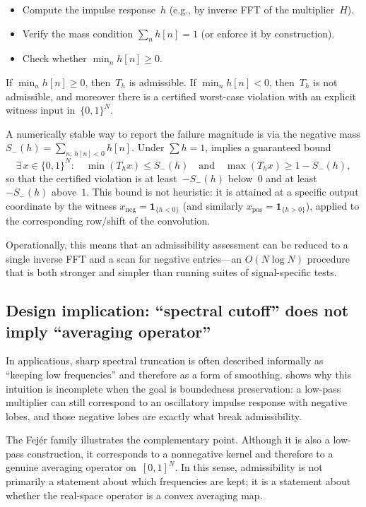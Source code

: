 \documentclass[11pt,a4paper]{article}
\theoremstyle{plain}
\theoremstyle{definition}
\theoremstyle{plain}
\newcommand{\xneg}{x_{\mathrm{neg}}}
\newcommand{\xpos}{x_{\mathrm{pos}}}
\newcommand{\Sminus}{S_{-}}
\begin{document}
\begin{itemize}[leftmargin=2em]
  \item Compute the impulse response~$h$ (e.g., by inverse FFT of the
    multiplier~$H$).
  \item Verify the mass condition $\sum_n h[n] = 1$ (or enforce it by
    construction).
  \item Check whether $\min_n h[n] \ge 0$.
\end{itemize}

If $\min_n h[n] \ge 0$, then~$T_h$ is admissible.  If $\min_n h[n] < 0$,
then~$T_h$ is not admissible, and moreover there is a certified worst-case
violation with an explicit witness input in~$\{0,1\}^N$.

A numerically stable way to report the failure magnitude is via the negative mass
$\Sminus(h) = \sum_{n:\,h[n]<0} h[n]$.  Under $\sum h = 1$, 
implies a guaranteed bound
\[
  \exists\,x \in \{0,1\}^N:\quad
  \min(T_h x) \le \Sminus(h)
  \quad\text{and}\quad
  \max(T_h x) \ge 1 - \Sminus(h),
\]
so that the certified violation is at least~$-\Sminus(h)$ below~$0$ and at
least~$-\Sminus(h)$ above~$1$.  This bound is not heuristic: it is attained at a
specific output coordinate by the witness
$\xneg = \mathbf{1}_{\{h<0\}}$ (and similarly
$\xpos = \mathbf{1}_{\{h>0\}}$), applied to the corresponding row/shift of the
convolution.

Operationally, this means that an admissibility assessment can be reduced to a
single inverse FFT and a scan for negative entries---an $O(N\log N)$ procedure
that is both stronger and simpler than running suites of signal-specific tests.


\subsection{Design implication: ``spectral cutoff'' does not imply ``averaging
  operator''}
\label{sec:design}

In applications, sharp spectral truncation is often described informally as
``keeping low frequencies'' and therefore as a form of smoothing.
 shows why this intuition is incomplete when the goal is
boundedness preservation: a low-pass multiplier can still correspond to an
oscillatory impulse response with negative lobes, and those negative lobes are
exactly what break admissibility.

The Fej\'er family illustrates the complementary point.  Although it is also a
low-pass construction, it corresponds to a nonnegative kernel and therefore to a
genuine averaging operator on~$[0,1]^N$.  In this sense, admissibility is not
primarily a statement about which frequencies are kept; it is a statement about
whether the real-space operator is a convex averaging map.
\end{document}

